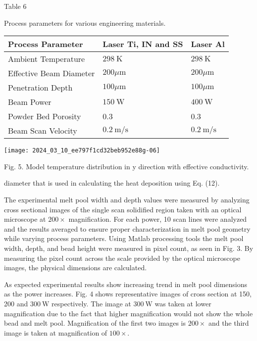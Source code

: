 \documentclass[10pt]{article}
\begin{document}
Table 6

Process parameters for various engineering materials.

\begin{center}
\begin{tabular}{lll}
\hline
Process Parameter & Laser Ti, IN and SS & Laser Al \\
\hline
Ambient Temperature & $298 \mathrm{~K}$ & $298 \mathrm{~K}$ \\
Effective Beam Diameter & $200 \mu \mathrm{m}$ & $200 \mu \mathrm{m}$ \\
Penetration Depth & $100 \mu \mathrm{m}$ & $100 \mu \mathrm{m}$ \\
Beam Power & $150 \mathrm{~W}$ & $400 \mathrm{~W}$ \\
Powder Bed Porosity & 0.3 & 0.3 \\
Beam Scan Velocity & $0.2 \mathrm{~m} / \mathrm{s}$ & $0.2 \mathrm{~m} / \mathrm{s}$ \\
\hline
\end{tabular}
\end{center}

\begin{center}
\texttt{[image: 2024\_03\_10\_ee797f1cd32beb952e88g-06]}
\end{center}

Fig. 5. Model temperature distribution in y direction with effective conductivity.

diameter that is used in calculating the heat deposition using Eq. (12).

The experimental melt pool width and depth values were measured by analyzing cross sectional images of the single scan solidified region taken with an optical microscope at $200 \times$ magnification. For each power, 10 scan lines were analyzed and the results averaged to ensure proper characterization in melt pool geometry while varying process parameters. Using Matlab processing tools the melt pool width, depth, and bead height were measured in pixel count, as seen in Fig. 3. By measuring the pixel count across the scale provided by the optical microscope images, the physical dimensions are calculated.

As expected experimental results show increasing trend in melt pool dimensions as the power increases. Fig. 4 shows representative images of cross section at 150, 200 and $300 \mathrm{~W}$ respectively. The image at $300 \mathrm{~W}$ was taken at lower magnification due to the fact that higher magnification would not show the whole bead and melt pool. Magnification of the first two images is $200 \times$ and the third image is taken at magnification of $100 \times$.
\end{document}
